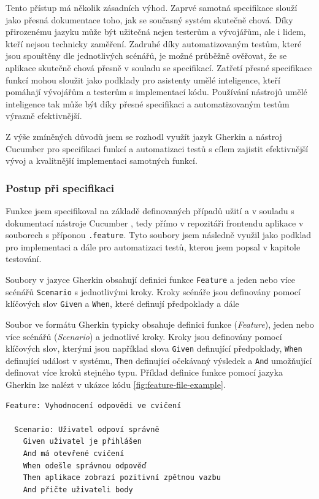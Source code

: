 Tento přístup má několik zásadních výhod. Zaprvé samotná specifikace slouží jako přesná dokumentace toho, jak se současný systém skutečně chová. Díky přirozenému jazyku může být užitečná nejen testerům a vývojářům, ale i lidem, kteří nejsou technicky zaměření. Zadruhé díky automatizovaným testům, které jsou spouštěny dle jednotlivých scénářů, je možné průběžně ověřovat, že se aplikace skutečně chová přesně v souladu se specifikací. Zatřetí přesné specifikace funkcí mohou sloužit jako podklady pro asistenty umělé inteligence, kteří pomáhají vývojářům a testerům s implementací kódu. Používání nástrojů umělé inteligence tak může být díky přesné specifikaci a automatizovaným testům výrazně efektivnější. \cite{CucumberDocs}

Z výše zmíněných důvodů jsem se rozhodl využít jazyk Gherkin a nástroj Cucumber pro specifikaci funkcí a automatizaci testů s cílem zajistit efektivnější vývoj a kvalitnější implementaci samotných funkcí.

\subsubsection{Postup při specifikaci}

Funkce jsem specifikoval na základě definovaných případů užití a v souladu s dokumentací nástroje Cucumber \cite{CucumberDocs}, tedy přímo v repozitáři frontendu aplikace v souborech s příponou \texttt{.feature}. Tyto soubory jsem následně využil jako podklad pro implementaci a dále pro automatizaci testů, kterou jsem popsal v kapitole testování.

Soubory v jazyce Gherkin obsahují definici funkce \texttt{Feature} a jeden nebo více scénářů \texttt{Scenario} s jednotlivými kroky. Kroky scénáře jsou definovány pomocí klíčových slov \texttt{Given} a \texttt{When}, které definují předpoklady a dále 

Soubor ve formátu Gherkin typicky obsahuje definici funkce (\textit{Feature}), jeden nebo více scénářů (\textit{Scenario}) a jednotlivé kroky. Kroky jsou definovány pomocí klíčových slov, kterými jsou například slova \texttt{Given} definující předpoklady, \texttt{When} definující událost v systému, \texttt{Then} definující očekávaný výsledek a \texttt{And} umožňující definovat více kroků stejného typu. Příklad definice funkce pomocí jazyka Gherkin lze nalézt v ukázce kódu \ref{fig:feature-file-example}.

\begin{listing}[ht]
    \begin{verbatim}
Feature: Vyhodnocení odpovědi ve cvičení

  Scenario: Uživatel odpoví správně
    Given uživatel je přihlášen
    And má otevřené cvičení
    When odešle správnou odpověď
    Then aplikace zobrazí pozitivní zpětnou vazbu
    And přičte uživateli body
    \end{verbatim}
    \caption{Ukázka specifikace funkce pomocí jazyka Gherkin}
    \label{fig:feature-file-example}
\end{listing}




